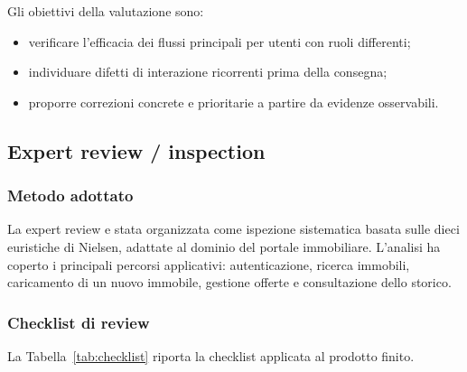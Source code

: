 \documentclass[a4paper,11pt]{article}
\begin{document}
Gli obiettivi della valutazione sono:
\begin{itemize}
  \item verificare l'efficacia dei flussi principali per utenti con ruoli differenti;
  \item individuare difetti di interazione ricorrenti prima della consegna;
  \item proporre correzioni concrete e prioritarie a partire da evidenze osservabili.
\end{itemize}

\subsection{Expert review / inspection}

\subsubsection{Metodo adottato}
La expert review e stata organizzata come ispezione sistematica basata sulle dieci euristiche di Nielsen, adattate al dominio del portale immobiliare. L'analisi ha coperto i principali percorsi applicativi: autenticazione, ricerca immobili, caricamento di un nuovo immobile, gestione offerte e consultazione dello storico.

\subsubsection{Checklist di review}
La Tabella~\ref{tab:checklist} riporta la checklist applicata al prodotto finito.
\end{document}
